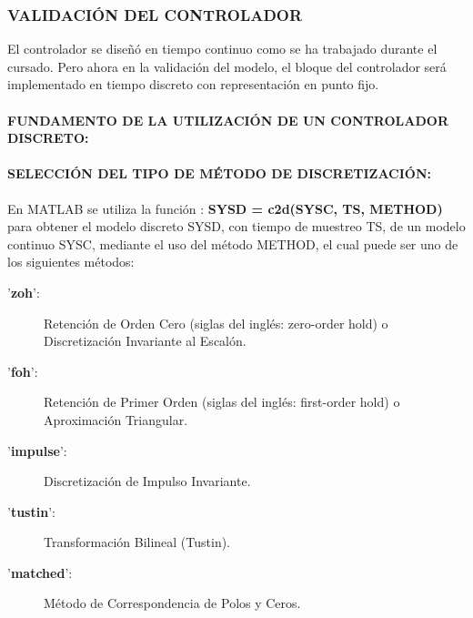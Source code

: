 \documentclass{article}
\begin{document}
\begin{sloppypar}
\subsubsection{VALIDACIÓN DEL CONTROLADOR}
\label{sec:VALIDACIÓN DEL CONTROLADOR}
El controlador se diseñó en tiempo continuo como se ha trabajado durante el cursado. Pero ahora en la validación del modelo, el bloque del controlador será implementado en tiempo discreto con representación en punto fijo.

\paragraph{FUNDAMENTO DE LA UTILIZACIÓN DE UN CONTROLADOR DISCRETO:}
\label{sec:FUNDAMENTO DE LA UTILIZACIÓN DE UN CONTROLADOR DISCRETO:}
\hfill

\hfill





\paragraph{SELECCIÓN DEL TIPO DE MÉTODO DE DISCRETIZACIÓN:}
\label{sec:SELECCIÓN DEL TIPO DE MÉTODO DE DISCRETIZACIÓN:}
\hfill

\hfill

En MATLAB se utiliza la función \cite{c2d}: \textbf{SYSD = c2d(SYSC, TS, METHOD)} para obtener el modelo discreto SYSD, con tiempo de muestreo TS, de un modelo continuo SYSC, mediante el uso del método METHOD, el cual puede ser uno de los siguientes métodos:
\begin{description}
    \item ['\textbf{zoh}':] Retención de Orden Cero (siglas del inglés: zero-order hold) o Discretización Invariante al Escalón.
    \item ['\textbf{foh}':] Retención de Primer Orden (siglas del inglés: first-order hold) o Aproximación Triangular.
    \item ['\textbf{impulse}':] Discretización de Impulso Invariante.
    \item ['\textbf{tustin}':] Transformación Bilineal (Tustin).
    \item ['\textbf{matched}':] Método de Correspondencia de Polos y Ceros.
\end{description}


\end{sloppypar}
\end{document}
